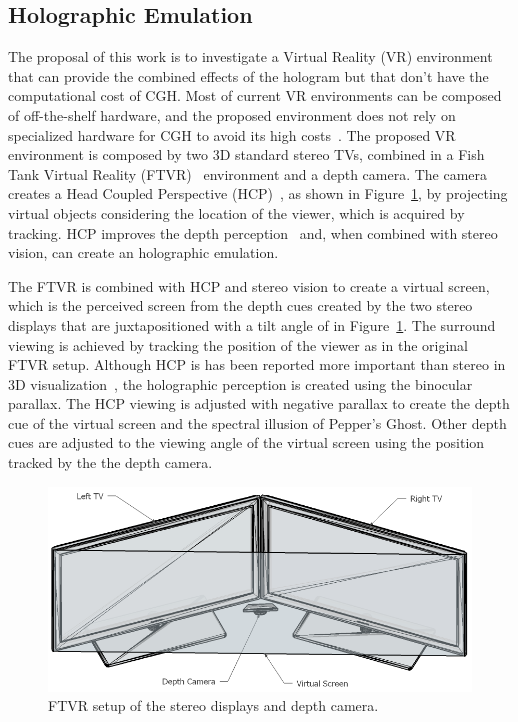 \subsection {Holographic Emulation}
\label{sec.holographic_emulation}

The proposal of this work is to investigate a Virtual Reality (VR) environment that can provide the combined effects of the hologram but that don't have the computational cost of CGH. Most of current VR environments can be composed of off-the-shelf hardware, and the proposed environment does not rely on specialized hardware for CGH to avoid its high costs~\cite{fournier2004}. The proposed VR environment is composed by two 3D standard stereo TVs, combined in a Fish Tank Virtual Reality (FTVR)~\cite{Ware1993} environment and a depth camera. The camera creates a Head Coupled Perspective (HCP)~\cite{okoshi2012}, as shown in Figure~\ref{fig.tv_setup}, by projecting virtual objects considering the location of the viewer, which is acquired by tracking. HCP improves the depth perception~\cite{li2012} and, when combined with stereo vision, can create an holographic emulation. 

The FTVR is combined with HCP and stereo vision to create a virtual screen, which is the perceived screen from the depth cues created by the two stereo displays that are juxtapositioned with a tilt angle of in Figure~\ref{fig.tv_setup}. The surround viewing is achieved by tracking the position of the viewer as in the original FTVR setup. Although HCP is has been reported more important than stereo in 3D visualization~\cite{Ware1993}, the holographic perception is created using the binocular parallax. The HCP viewing is adjusted with negative parallax to create the depth cue of the virtual screen and the spectral illusion of Pepper's Ghost. Other depth cues are adjusted to the viewing angle of the virtual screen using the position tracked by the the depth camera.

\begin{figure}[!hbt]
\centering
\includegraphics[width=\linewidth,keepaspectratio=true]{figs/labsetup_01.png}
\caption{FTVR setup of the stereo displays and depth camera.}
\label{fig.tv_setup}
\end{figure}

